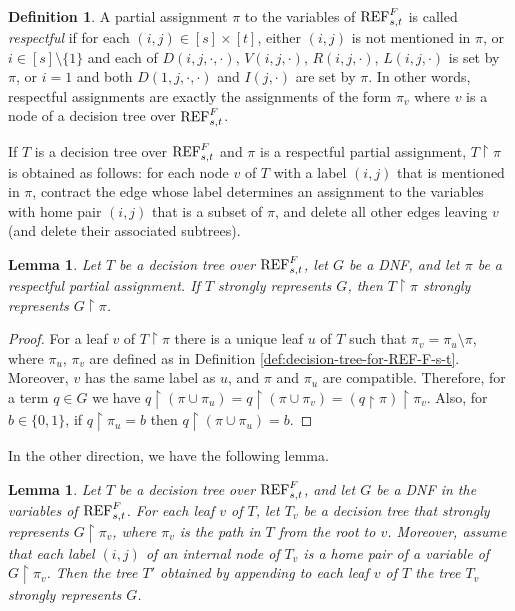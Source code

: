 \documentclass[10pt,a4paper]{article}
\newtheorem{lemma}[theorem]{Lemma}
\theoremstyle{remark}
\newtheorem*{switching lemma}{Switching Lemma}
\newtheorem*{open problem}{Open Problem}
\theoremstyle{definition}
\newtheorem{definition}[theorem]{Definition}
\begin{document}
\begin{definition}
A partial assignment $\pi$ to the variables of $\textnormal{REF}^{F}_{s,t}$ is called \emph{respectful} if for each $(i,j) \in [s] \times [t]$, either $(i,j)$ is not mentioned in $\pi$, or $i \in [s]\! \setminus \! \{1\}$ and each of $D(i,j,\cdot, \cdot)$, $V(i,j, \cdot)$, $R(i,j, \cdot)$, $L(i,j, \cdot)$ is set by $\pi$, or $i=1$ and both $D(1,j,\cdot, \cdot)$ and $I(j, \cdot)$ are set by $\pi$. In other words, respectful assignments are exactly the assignments of the form $\pi_v$ where $v$ is a node of a decision tree over $\textnormal{REF}^{F}_{s,t}$.

If $T$ is a decision tree over $\textnormal{REF}^{F}_{s,t}$ and $\pi$ is a respectful partial assignment, $T \! \restriction \! \pi$ is obtained as follows: for each node $v$ of $T$ with a label $(i,j)$ that is mentioned in $\pi$, contract the edge whose label determines an assignment to the variables with home pair $(i,j)$ that is a subset of $\pi$, and delete all other edges leaving $v$ (and delete their associated subtrees).
\end{definition}

\begin{lemma}
\label{lem:decision_tree_restriction_by_respectful}
Let $T$ be a decision tree over $\textnormal{REF}^{F}_{s,t}$, let $G$ be a DNF, and let $\pi$ be a respectful partial assignment. If $T$ strongly represents $G$, then $T \! \restriction \! \pi$ strongly represents $G \! \restriction \! \pi$.
\end{lemma}

\begin{proof}
For a leaf $v$ of $T \! \restriction \! \pi$ there is a unique leaf $u$ of $T$ such that $\pi_v = \pi_u \setminus \pi$, where $\pi_u$, $\pi_v$ are defined as in Definition \ref{def:decision-tree-for-REF-F-s-t}. Moreover, $v$ has the same label as $u$, and $\pi$ and $\pi_u$ are compatible. Therefore, for a term $q \in G$ we have $q \! \restriction \! (\pi \cup \pi_u) = q \! \restriction \! (\pi \cup \pi_v) = (q \! \restriction \! \pi) \! \restriction \! \pi_v$. Also, for $b \in \{0,1\}$, if $q \! \restriction \! \pi_u = b$ then $q \! \restriction \! (\pi \cup \pi_u) = b$.
\end{proof}

In the other direction, we have the following lemma.

\begin{lemma}
\label{lem:decision_tree_composition}
Let $T$ be a decision tree over $\textnormal{REF}^{F}_{s,t}$, and let $G$ be a DNF in the variables of $\textnormal{REF}^{F}_{s,t}$. For each leaf $v$ of $T$, let $T_v$ be a decision tree that strongly represents $G \! \restriction \! \pi_v$, where $\pi_v$ is the path in $T$ from the root to $v$. Moreover, assume that each label $(i,j)$ of an internal node of $T_v$ is a home pair of a variable of $G \! \restriction \! \pi_v$. Then the tree $T'$ obtained by appending to each leaf $v$ of $T$ the tree $T_v$ strongly represents $G$.
\end{lemma}
\end{document}
